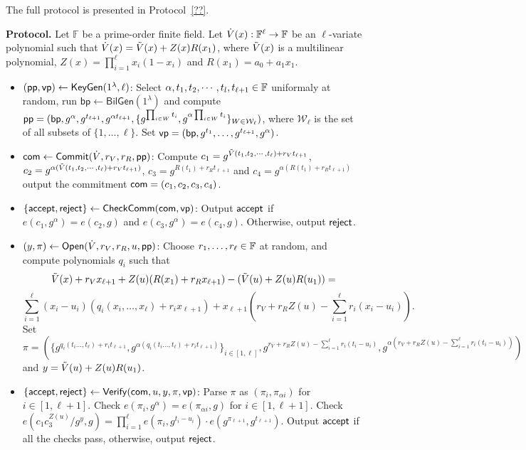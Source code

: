 The full protocol is presented in Protocol~\ref{??}.

\medskip\noindent\textbf{Protocol.}
Let $\mathbb{F}$ be a prime-order finite field. Let $\dot{V}(x): \mathbb{F}^\ell\rightarrow \mathbb{F}$ be an $\ell$-variate polynomial such that $\dot{V}(x) = \tilde{V}(x)+Z(x)R(x_1)$, where $\tilde{V}(x)$ is a multilinear polynomial, $Z(x) = \prod_{i=1}^\ell x_i(1-x_i)$ and $R(x_1) = a_0+a_1x_1$. 


\begin{itemize}
\item $(\mathsf{pp}, \mathsf{vp}) \leftarrow \mathsf{KeyGen}(1^\lambda, \ell)$: Select $\alpha, t_1, t_2, \cdots, t_l, t_{\ell+1} \in \mathbb{F}$ uniformaly at random, run $\mathsf{bp} \leftarrow \mathsf{BilGen}(1^{\lambda})$ and compute $\mathsf{pp} = (\mathsf{bp},g^\alpha, g^{t_{\ell+1}}, g^{\alpha t_{\ell+1}}, \{g^{\prod_{i\in W}t_i}, g^{\alpha\prod_{i\in W}t_i}\}_{W\in \mathcal{W}_\ell})$, where $\mathcal{W}_\ell$ is the set of all subsets of $\{1,\ldots, \ell\}$. Set $\mathsf{vp} = (\mathsf{bp},g^{t_1}, \ldots, g^{t_{\ell+1}}, g^\alpha)$.


\item ${{\sf com}} \leftarrow \mathsf{Commit}(\dot{V}, r_V, r_R, \mathsf{pp})$: Compute $c_1 = g^{\tilde{V}(t_1, t_2, \cdots, t_\ell) + r_Vt_{\ell+1}}$, $c_2 = g^{\alpha(\tilde{V}(t_1, t_2, \cdots, t_\ell) + r_Vt_{\ell+1})}$, $c_3 = g^{R(t_1)+r_Rt_{\ell+1}}$ and $c_4 = g^{\alpha(R(t_1)+r_Rt_{\ell+1})}$  output the commitment ${{\sf com}} = (c_1, c_2,c_3,c_4)$.

\item $\{\mathsf{accept},\mathsf{reject}\}\leftarrow\mathsf{CheckComm}({{\sf com}}, \mathsf{vp})$: Output $\mathsf{accept}$ if $e(c_1, g^\alpha) = e(c_2,g)$ and $e(c_3, g^\alpha) = e(c_4,g)$. Otherwise, output $\mathsf{reject}$.

\item $(y,\pi)\leftarrow\mathsf{Open}(\dot{V}, r_V, r_R, u,\mathsf{pp})$: Choose $r_1,\ldots, r_\ell\in\mathbb{F}$ at random, and compute polynomials $q_i$ such that
\[
\tilde{V}(x)+r_Vx_{\ell+1}+Z(u)(R(x_1)+r_Rx_{\ell+1}) -(\tilde{V}(u)+Z(u)R(u_1)) =
\]
\[ \sum_{i=1}^\ell(x_i-u_i)(q_i(x_i,\ldots,x_\ell)+r_ix_{\ell+1})+x_{\ell+1}(r_V+r_RZ(u)-\sum_{i=1}^\ell r_i(x_i-u_i)).
\]   
Set $\pi = (\{g^{q_i(t_i\ldots, t_\ell)+r_it_{\ell+1}}, g^{\alpha(q_i(t_i\ldots, t_\ell)+r_it_{\ell+1})}\}_{i\in[1,\ell]}, g^{r_V+r_RZ(u)-\sum_{i=1}^\ell r_i(t_i-u_i)}, g^{\alpha(r_V+r_RZ(u)-\sum_{i=1}^\ell r_i(t_i-u_i))})$ and $y = \tilde{V}(u)+Z(u)R(u_1)$.

\item $\{\mathsf{accept},\mathsf{reject}\}\leftarrow\mathsf{Verify}({{\sf com}},u,y,\pi,\mathsf{vp})$: Parse $\pi$ as $(\pi_i,\pi_{\alpha i})$ for $i\in[1,\ell+1]$. Check $e(\pi_i,g^\alpha) = e(\pi_{\alpha i},g)$ for $i\in[1,\ell+1]$. Check $e(c_1c_3^{Z(u)}/g^y, g) = \prod_{i=1}^\ell e(\pi_i, g^{t_i-u_i}) \cdot e(g^{\pi_{\ell+1}},g^{t_{\ell+1}})$. Output $\mathsf{accept}$ if all the checks pass, otherwise, output $\mathsf{reject}$.


\end{itemize} 


